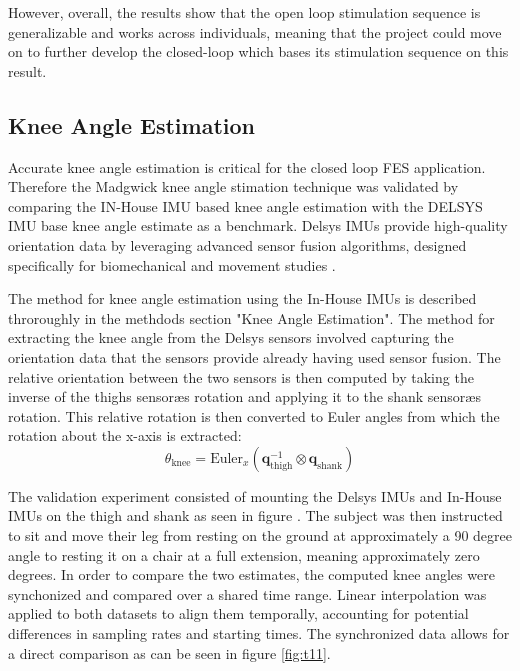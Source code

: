 However, overall, the results show that the open loop stimulation sequence is generalizable and works across individuals, meaning that the project could move on to further develop the closed-loop which bases its stimulation sequence on this result.


\subsection{Knee Angle Estimation}
Accurate knee angle estimation is critical for the closed loop FES application. Therefore the Madgwick knee angle stimation technique was validated by comparing the IN-House IMU based knee angle estimation with the DELSYS IMU base knee angle estimate as a benchmark. Delsys IMUs provide high-quality orientation data by leveraging advanced sensor fusion algorithms, designed specifically for biomechanical and movement studies . 


The method for knee angle estimation using the In-House IMUs is described throroughly in the methdods section "Knee Angle Estimation". The method for extracting the knee angle from the Delsys sensors involved capturing the orientation data that the sensors provide already having used sensor fusion. The relative orientation between the two sensors is then computed by taking the inverse of the thighs sensoræs rotation and applying it to the shank sensoræs rotation. This relative rotation is then converted to Euler angles from which the rotation about the x-axis is extracted:
\begin{equation}
    \theta_{\text{knee}} = \text{Euler}_x \left( \mathbf{q}_{\text{thigh}}^{-1} \otimes \mathbf{q}_{\text{shank}} \right)
\end{equation}

The validation experiment consisted of mounting the Delsys IMUs and In-House IMUs on the thigh and shank as seen in figure . The subject was then instructed to sit and move their leg from resting on the ground at approximately a 90 degree angle to resting it on a chair at a full extension, meaning approximately zero degrees. In order to compare the two estimates, the computed knee angles were synchonized and compared over a shared time range. Linear interpolation was applied to both datasets to align them temporally, accounting for potential differences in sampling rates and starting times. The synchronized data allows for a direct comparison as can be seen in figure \ref{fig:t11}. 

